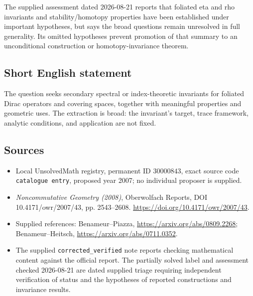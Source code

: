 \documentclass[11pt]{article}
\begin{document}
The supplied assessment dated 2026-08-21 reports that foliated eta and rho invariants and stability/homotopy properties have been established under important hypotheses, but says the broad questions remain unresolved in full generality. Its omitted hypotheses prevent promotion of that summary to an unconditional construction or homotopy-invariance theorem.
\subsection{Short English statement}
The question seeks secondary spectral or index-theoretic invariants for foliated Dirac operators and covering spaces, together with meaningful properties and geometric uses. The extraction is broad: the invariant's target, trace framework, analytic conditions, and application are not fixed.
\subsection{Sources}
\begin{itemize}
\item Local UnsolvedMath registry, permanent ID \(30000843\), exact source code \texttt{catalogue entry}, proposed year 2007; no individual proposer is supplied.
\item \emph{Noncommutative Geometry (2008)}, Oberwolfach Reports, DOI 10.4171/owr/2007/43, pp. 2543--2608. \url{https://doi.org/10.4171/owr/2007/43}.
\item Supplied references: Benameur--Piazza, \url{https://arxiv.org/abs/0809.2268}; Benameur--Heitsch, \url{https://arxiv.org/abs/0711.0352}.
\item The supplied \texttt{corrected\_verified} note reports checking mathematical content against the official report. The partially solved label and assessment checked 2026-08-21 are dated supplied triage requiring independent verification of status and the hypotheses of reported constructions and invariance results.
\end{itemize}
\end{document}
